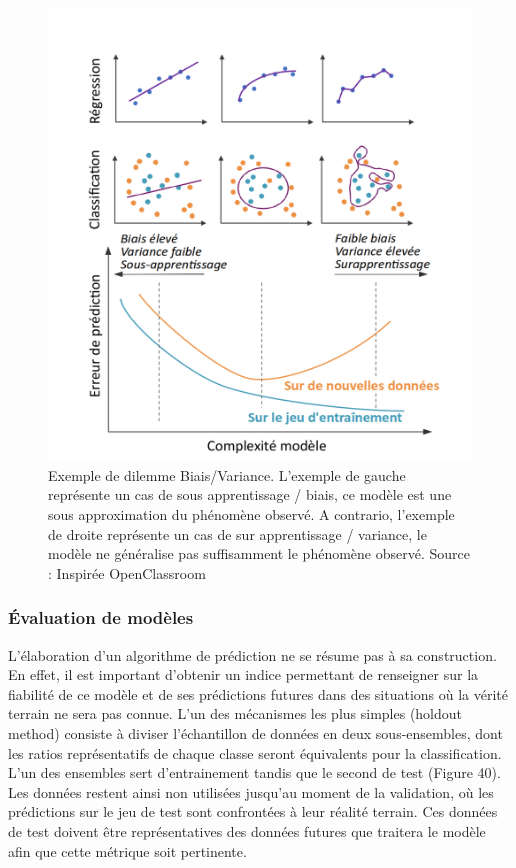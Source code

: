 \begin{figure}[H]
    \centering
    \includegraphics[width=\linewidth]{contents/chapter_3/resources/UnderfitOverfit.pdf}
    \caption{Exemple de dilemme Biais/Variance. L’exemple de gauche représente un cas de sous apprentissage / biais, ce modèle est une sous approximation du phénomène observé. A contrario, l’exemple de droite représente un cas de sur apprentissage / variance, le modèle ne généralise pas suffisamment le phénomène observé. Source : Inspirée OpenClassroom }
    \label{fig:chapter_3:UnderfitOverfit}
\end{figure}

\subsubsection{Évaluation de modèles}
L’élaboration d’un algorithme de prédiction ne se résume pas à sa construction. En effet, il est important d’obtenir un indice permettant de renseigner sur la fiabilité de ce modèle et de ses prédictions futures dans des situations où la vérité terrain ne sera pas connue. L’un des mécanismes les plus simples (holdout method) consiste à diviser l’échantillon de données en deux sous-ensembles, dont les ratios représentatifs de chaque classe seront équivalents pour la classification. L’un des ensembles sert d’entrainement tandis que le second de test (Figure 40). Les données restent ainsi non utilisées jusqu’au moment de la validation, où les prédictions sur le jeu de test sont confrontées à leur réalité terrain. Ces données de test doivent être représentatives des données futures que traitera le modèle afin que cette métrique soit pertinente.

